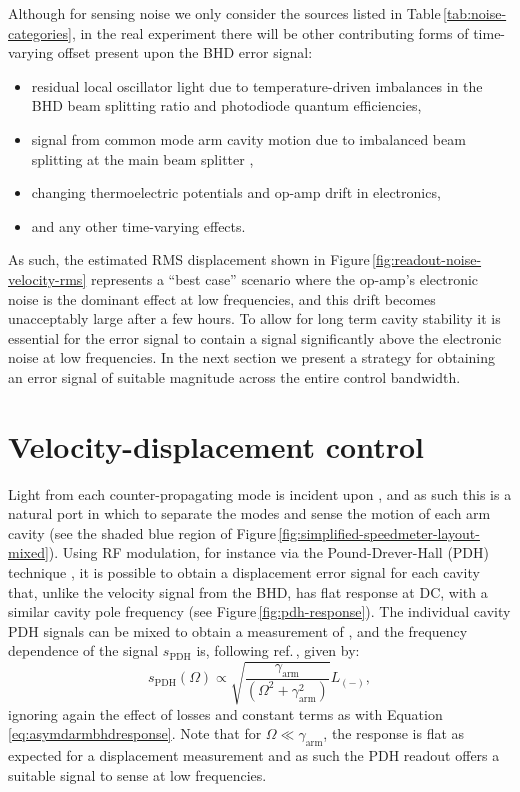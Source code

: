 Although for sensing noise we only consider the sources listed in Table\,\ref{tab:noise-categories}, in the real experiment there will be other contributing forms of time-varying offset present upon the \gls{BHD} error signal:
\begin{itemize}
  \item residual local oscillator light due to temperature-driven imbalances in the \gls{BHD} beam splitting ratio and photodiode quantum efficiencies,
  \item signal from common mode arm cavity motion due to imbalanced beam splitting at the main beam splitter \cite{Danilishin2015},
  \item changing thermoelectric potentials and op-amp drift in electronics,
  \item and any other time-varying effects.
\end{itemize}
As such, the estimated \gls{RMS} displacement shown in Figure\,\ref{fig:readout-noise-velocity-rms} represents a ``best case'' scenario where the op-amp's electronic noise is the dominant effect at low frequencies, and this drift becomes unacceptably large after a few hours. To allow for long term cavity stability it is essential for the error signal to contain a signal significantly above the electronic noise at low frequencies. In the next section we present a strategy for obtaining an error signal of suitable magnitude across the entire control bandwidth.
 
\section{\label{sec:mixed-control}Velocity-displacement control}
Light from each counter-propagating mode is incident upon \MNINE{}, and as such this is a natural port in which to separate the modes and sense the motion of each arm cavity (see the shaded blue region of Figure\,\ref{fig:simplified-speedmeter-layout-mixed}). Using \gls{RF} modulation, for instance via the Pound-Drever-Hall (\gls{PDH}) technique \cite{Drever1983}, it is possible to obtain a displacement error signal for each cavity that, unlike the velocity signal from the \gls{BHD}, has flat response at \gls{DC}, with a similar cavity pole frequency (see Figure\,\ref{fig:pdh-response}). The individual cavity \gls{PDH} signals can be mixed to obtain a measurement of \LMINUS{}, and the frequency dependence of the signal $s_{\textrm{PDH}}$ is, following ref.\,\cite{Kimble2001}, given by:
\begin{equation}
  \label{eq:m9darmpdhresponse}
  s_{\textrm{PDH}} \left( \Omega \right) \propto \sqrt{\frac{\gamma_{\textrm{arm}}}{\left(\Omega^2 + \gamma_{\textrm{arm}}^2 \right)}} L_{\left(-\right)},
\end{equation}
ignoring again the effect of losses and constant terms as with Equation \ref{eq:asymdarmbhdresponse}. Note that for $\Omega \ll \gamma_{\textrm{arm}}$, the response is flat as expected for a displacement measurement and as such the PDH readout offers a suitable signal to sense \LMINUS{} at low frequencies.

